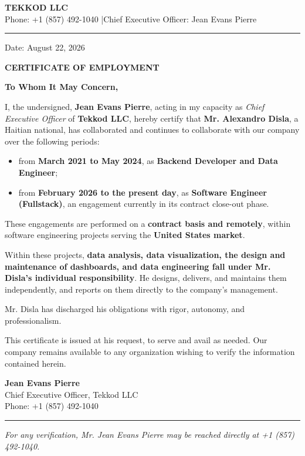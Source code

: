 \documentclass[11pt,a4paper]{article}
\begin{document}
{\Large\bfseries TEKKOD LLC}\\[3pt]
{\small Phone: +1 (857) 492-1040 \quad|\quad Chief Executive Officer: Jean Evans Pierre}

\vspace{14pt}
\hrule
\vspace{18pt}

\begin{flushright}
Date: August 22, 2026
\end{flushright}

\begin{center}
    {\large\bfseries CERTIFICATE OF EMPLOYMENT}
\end{center}

\vspace{10pt}

\onehalfspacing

\textbf{To Whom It May Concern,}

I, the undersigned, \textbf{Jean Evans Pierre}, acting in my capacity as \textit{Chief Executive
Officer} of \textbf{Tekkod LLC}, hereby certify that \textbf{Mr. Alexandro Disla}, a Haitian
national, has collaborated and continues to collaborate with our company over the following
periods:

\begin{itemize}
    \item from \textbf{March 2021 to May 2024}, as \textbf{Backend Developer and Data Engineer};
    \item from \textbf{February 2026 to the present day}, as \textbf{Software Engineer
    (Fullstack)}, an engagement currently in its contract close-out phase.
\end{itemize}

These engagements are performed on a \textbf{contract basis and remotely}, within software
engineering projects serving the \textbf{United States market}.

Within these projects, \textbf{data analysis, data visualization, the design and maintenance of
dashboards, and data engineering fall under Mr. Disla's individual responsibility}. He designs,
delivers, and maintains them independently, and reports on them directly to the company's
management.

Mr. Disla has discharged his obligations with rigor, autonomy, and professionalism.

This certificate is issued at his request, to serve and avail as needed. Our company remains
available to any organization wishing to verify the information contained herein.

\vspace{16pt}
\singlespacing

\begin{flushleft}
\textbf{Jean Evans Pierre}\\
Chief Executive Officer, Tekkod LLC\\
Phone: +1 (857) 492-1040\\
\end{flushleft}

\vspace{10pt}
\hrule
\vspace{6pt}
{\footnotesize\itshape For any verification, Mr. Jean Evans Pierre may be reached directly at
+1 (857) 492-1040.}
\end{document}
